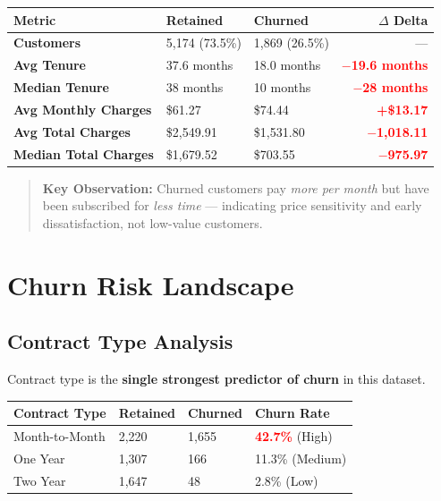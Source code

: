 \documentclass[11pt,a4paper]{article}
\newcommand{\risk}[1]{\textbf{\textcolor{red}{#1}}}
\begin{document}
\begin{table}[h!]
\centering
\begin{tabularx}{\textwidth}{l l l r}
\toprule
\textbf{Metric} & \textbf{Retained} & \textbf{Churned} & \textbf{$\Delta$ Delta} \\
\midrule
\textbf{Customers} & 5,174 (73.5\%) & 1,869 (26.5\%) & --- \\
\textbf{Avg Tenure} & 37.6 months & 18.0 months & \risk{$-$19.6 months} \\
\textbf{Median Tenure} & 38 months & 10 months & \risk{$-$28 months} \\
\textbf{Avg Monthly Charges} & \$61.27 & \$74.44 & \risk{+\$13.17} \\
\textbf{Avg Total Charges} & \$2,549.91 & \$1,531.80 & \risk{$-$1,018.11} \\
\textbf{Median Total Charges} & \$1,679.52 & \$703.55 & \risk{$-$975.97} \\
\bottomrule
\end{tabularx}
\end{table}

\begin{quote}
\textbf{Key Observation:} Churned customers pay \textit{more per month} but have been subscribed for \textit{less time} — indicating price sensitivity and early dissatisfaction, not low-value customers.
\end{quote}

\newpage

\section{Churn Risk Landscape}

\subsection{Contract Type Analysis}
Contract type is the \textbf{single strongest predictor of churn} in this dataset.

\begin{table}[h!]
\centering
\begin{tabularx}{\textwidth}{l l l l}
\toprule
\textbf{Contract Type} & \textbf{Retained} & \textbf{Churned} & \textbf{Churn Rate} \\
\midrule
Month-to-Month & 2,220 & 1,655 & \risk{42.7\%} (High) \\
One Year & 1,307 & 166 & 11.3\% (Medium) \\
Two Year & 1,647 & 48 & 2.8\% (Low) \\
\bottomrule
\end{tabularx}
\end{table}
\end{document}
